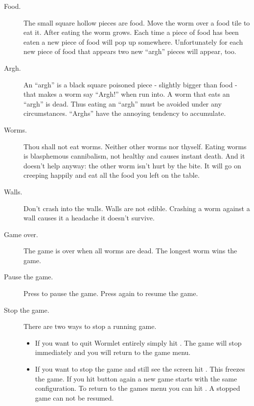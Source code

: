\begin{description}
\item[Food.]
The small square hollow pieces are food. Move the worm over a food tile
to eat it. After eating the worm grows. Each time a piece of food has
been eaten a new piece of food will pop up somewhere. Unfortunately for
each new piece of food that appears two new ``argh'' pieces will
appear, too.
\item[Argh.]
An ``argh'' is a black square poisoned piece {}- slightly bigger than
food {}- that makes a worm say ``Argh!'' when
run into.  A worm that eats an ``argh'' is dead. Thus eating an
``argh'' must be avoided under any circumstances. ``Arghs'' have the
annoying tendency to accumulate. 
\item[Worms.]
Thou shall not eat worms. Neither other worms nor thyself. Eating worms
is blasphemous cannibalism, not healthy and causes instant
death. And it doesn't help anyway: the other worm
isn't hurt by the bite. It will go on creeping happily
and eat all the food you left on the table. 
\item[Walls.]
Don't crash into the walls. Walls are not edible.
Crashing a worm against a wall causes it a headache it
doesn't survive. 
\item[Game over.]
The game is over when all worms are dead. The longest worm wins the
game. 
\item [Pause the game.]
Press
to pause the game. Press
again to resume the game.

\item[Stop the game.]
There are two ways to stop a running game.

\begin{itemize}
\item If you want to quit Wormlet entirely simply hit
.
The game will stop immediately and you will return to the game menu. 
\item If you want to stop the game and still see the screen hit 
.
This freezes the game. If you hit
button again a new game starts with the same configuration. To return to the
games menu you can hit
. A stopped game can not be resumed. 
\end{itemize}
\end{description}

